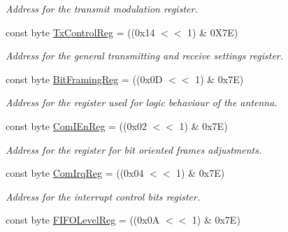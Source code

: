 \begin{DoxyCompactItemize}
\begin{DoxyCompactList}\small\item\em Address for the transmit modulation register. \end{DoxyCompactList}\item 
const byte \hyperlink{classmfrc522_a50e31c19c5289374ea3f8e397b30ae5a}{Tx\+Control\+Reg} = ((0x14 $<$$<$ 1) \& 0\+X7\+E)\hypertarget{classmfrc522_a50e31c19c5289374ea3f8e397b30ae5a}{}\label{classmfrc522_a50e31c19c5289374ea3f8e397b30ae5a}

\begin{DoxyCompactList}\small\item\em Address for the general transmitting and receive settings register. \end{DoxyCompactList}\item 
const byte \hyperlink{classmfrc522_a1147f52a011b9cf58a3bfe39886bfa55}{Bit\+Framing\+Reg} = ((0x0\+D $<$$<$ 1) \& 0x7\+E)\hypertarget{classmfrc522_a1147f52a011b9cf58a3bfe39886bfa55}{}\label{classmfrc522_a1147f52a011b9cf58a3bfe39886bfa55}

\begin{DoxyCompactList}\small\item\em Address for the register used for logic behaviour of the antenna. \end{DoxyCompactList}\item 
const byte \hyperlink{classmfrc522_a746894aa1857a071ab9573ecf07621a0}{Com\+I\+En\+Reg} = ((0x02 $<$$<$ 1) \& 0x7\+E)\hypertarget{classmfrc522_a746894aa1857a071ab9573ecf07621a0}{}\label{classmfrc522_a746894aa1857a071ab9573ecf07621a0}

\begin{DoxyCompactList}\small\item\em Address for the register for bit oriented frames adjustments. \end{DoxyCompactList}\item 
const byte \hyperlink{classmfrc522_a4fb04a221dc26dee599d32119eebe0cc}{Com\+Irq\+Reg} = ((0x04 $<$$<$ 1) \& 0x7\+E)\hypertarget{classmfrc522_a4fb04a221dc26dee599d32119eebe0cc}{}\label{classmfrc522_a4fb04a221dc26dee599d32119eebe0cc}

\begin{DoxyCompactList}\small\item\em Address for the interrupt control bits register. \end{DoxyCompactList}\item 
const byte \hyperlink{classmfrc522_a75a41a00f61652eec99c887d98df8ed4}{F\+I\+F\+O\+Level\+Reg} = ((0x0\+A $<$$<$ 1) \& 0x7\+E)\hypertarget{classmfrc522_a75a41a00f61652eec99c887d98df8ed4}{}\label{classmfrc522_a75a41a00f61652eec99c887d98df8ed4}


\end{DoxyCompactItemize}
